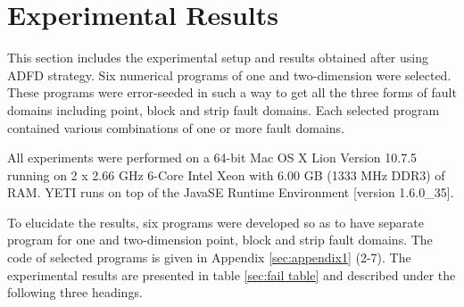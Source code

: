 \documentclass[runningheads,a4paper]{llncs}
\begin{document}

\section{Experimental Results} \label{sec:experimentalResults}
This section includes the experimental setup and results obtained after using ADFD strategy. Six numerical programs of one and two-dimension were selected. These programs were error-seeded in such a way to get all the three forms of fault domains including point, block and strip fault domains. Each selected program contained various combinations of one or more fault domains. 

All experiments were performed on a 64-bit Mac OS X Lion Version 10.7.5 running on 2 x 2.66 GHz 6-Core Intel Xeon with 6.00 GB (1333 MHz DDR3) of RAM. YETI runs on top of the Java\texttrademark  SE Runtime Environment [version 1.6.0\_35]. 

To elucidate the results, six programs were developed so as to have separate program for one and two-dimension point, block and strip fault domains. The code of selected programs is given in Appendix \ref{sec:appendix1} (2-7). The experimental results are presented in table \ref{sec:fail table} and described under the following three headings.

\end{document}
